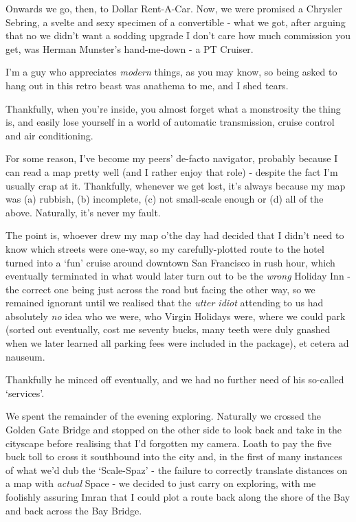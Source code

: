\documentclass[a5paper,titlepage,draft]{book}
\begin{document}
Onwards we go, then, to Dollar Rent-A-Car.  Now, we were promised a Chrysler Sebring, a svelte and sexy specimen of a convertible - what we got, after arguing that no we didn't want a sodding upgrade I don't care how much commission you get, was Herman Munster's hand-me-down - a PT Cruiser.

I'm a guy who appreciates \emph{modern} things, as you may know, so being asked to hang out in this retro beast was anathema to me, and I shed tears.

Thankfully, when you're inside, you almost forget what a monstrosity the thing is, and easily lose yourself in a world of automatic transmission, cruise control and air conditioning.

For some reason, I've become my peers' de-facto navigator, probably because I can read a map pretty well (and I rather enjoy that role) - despite the fact I'm usually crap at it.  Thankfully, whenever we get lost, it's always because my map was (a) rubbish, (b) incomplete, (c) not small-scale enough or (d) all of the above.  Naturally, it's never my fault.

The point is, whoever drew my map o'the day had decided that I didn't need to know which streets were one-way, so my carefully-plotted route to the hotel turned into a `fun' cruise around downtown San Francisco in rush hour, which eventually terminated in what would later turn out to be the \emph{wrong} Holiday Inn - the correct one being just across the road but facing the other way, so we remained ignorant until we realised that the \emph{utter idiot} attending to us had absolutely \emph{no} idea who we were, who Virgin Holidays were, where we could park (sorted out eventually, cost me seventy bucks, many teeth were duly gnashed when we later learned all parking fees were included in the package), et cetera ad nauseum.

Thankfully he minced off eventually, and we had no further need of his so-called `services'.

We spent the remainder of the evening exploring.  Naturally we crossed the Golden Gate Bridge and stopped on the other side to look back and take in the cityscape before realising that I'd forgotten my camera.  Loath to pay the five buck toll to cross it southbound into the city and, in the first of many instances of what we'd dub the `Scale-Spaz' - the failure to correctly translate distances on a map with \emph{actual} Space - we decided to just carry on exploring, with me foolishly assuring Imran that I could plot a route back along the shore of the Bay and back across the Bay Bridge.
\end{document}
